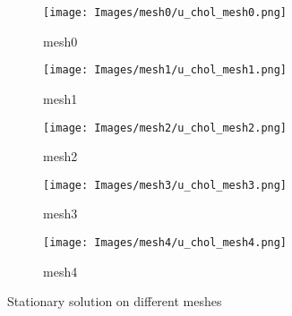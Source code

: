 \begin{figure}[htbp]
    \centering
    \begin{subfigure}{0.45\textwidth}
        \centering
        \texttt{[image: Images/mesh0/u\_chol\_mesh0.png]}
        \caption{mesh0}
    \end{subfigure}
    \hfill
    \begin{subfigure}{0.45\textwidth}
        \centering
        \texttt{[image: Images/mesh1/u\_chol\_mesh1.png]}
        \caption{mesh1}
    \end{subfigure}
    \hfill
    \begin{subfigure}{0.45\textwidth}
        \centering
        \texttt{[image: Images/mesh2/u\_chol\_mesh2.png]}
        \caption{mesh2}
    \end{subfigure}

    \vspace{1em} %

    \begin{subfigure}{0.45\textwidth}
        \centering
        \texttt{[image: Images/mesh3/u\_chol\_mesh3.png]}
        \caption{mesh3}
    \end{subfigure}
    \hfill
    \begin{subfigure}{0.45\textwidth}
        \centering
        \texttt{[image: Images/mesh4/u\_chol\_mesh4.png]}
        \caption{mesh4}
    \end{subfigure}

    \caption{Stationary solution on different meshes}
    \label{fig: stationary_solution}
\end{figure}

 
